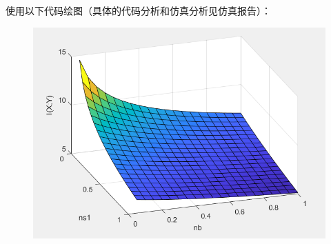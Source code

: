 \documentclass[12pt]{article}
\begin{document}
使用以下代码绘图（具体的代码分析和仿真分析见仿真报告）：

\begin{figure}[htp]
    \centering
    \includegraphics[width=12.5cm]{Image_of_Q3RERE.png}
\end{figure}
\newpage
\end{document}
